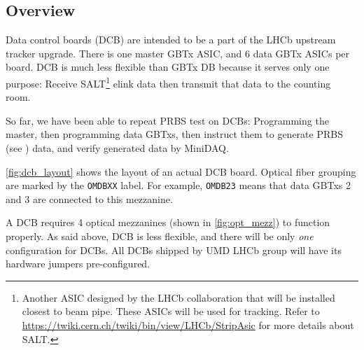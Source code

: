 \subsection{Overview}
Data control boards (DCB) are intended to be a part of the LHCb upstream tracker
upgrade.
There is one master GBTx ASIC, and 6 data GBTx ASICs per board.
DCB is much less flexible than GBTx DB because it serves only one purpose:
Receive SALT\footnote{
    Another ASIC designed by the LHCb collaboration that will be installed
    closest to beam pipe. These ASICs will be used for tracking. Refer to
    \url{https://twiki.cern.ch/twiki/bin/view/LHCb/StripAsic}
    for more details about SALT.
} elink data then transmit that data to the counting room.

So far, we have been able to repeat PRBS test on DCBs:
Programming the master, then programming data GBTxs, then instruct them to
generate PRBS (see ) data, and verify generated data by
MiniDAQ.

\autoref{fig:dcb_layout} shows the layout of an actual DCB board.
Optical fiber grouping are marked by the \texttt{OMDBXX} label. For example,
\texttt{OMDB23} means that data GBTxs 2 and 3 are connected to this mezzanine.

A DCB requires 4 optical mezzanines (shown in \autoref{fig:opt_mezz}) to
function properly.
As said above, DCB is less flexible, and there will be only \emph{one}
configuration for DCBs.
All DCBs shipped by UMD LHCb group will have its hardware jumpers
pre-configured.

